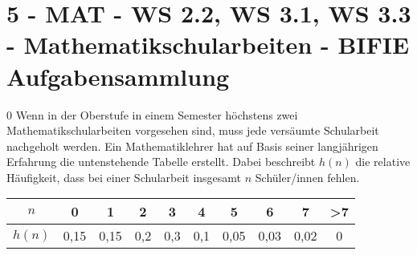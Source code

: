\section{5 - MAT - WS 2.2, WS 3.1, WS 3.3 - Mathematikschularbeiten - BIFIE Aufgabensammlung}

\begin{langesbeispiel} \item[0] %
Wenn in der Oberstufe in einem Semester höchstens zwei Mathematikschularbeiten vorgesehen sind, muss jede versäumte Schularbeit nachgeholt werden.
				Ein Mathematiklehrer hat auf Basis seiner langjährigen Erfahrung die untenstehende Tabelle erstellt. Dabei beschreibt $h(n)$ die relative Häufigkeit, dass bei einer Schularbeit insgesamt $n$ Schüler/innen fehlen.\vspace{0,3cm}
				
\begin{center}
				\begin{tabular}{|c|c|c|c|c|c|c|c|c|c|} \hline
				$n$&0&1&2&3&4&5&6&7&>7\\ \hline
				$h(n)$&0,15&0,15&0,2&0,3&0,1&0,05&0,03&0,02&0\\ \hline
				\end{tabular}	
\end{center}%

\begin{aufgabenstellung}
\item %


\item %

\end{aufgabenstellung}
\end{langesbeispiel}
